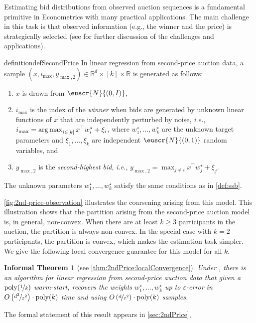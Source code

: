 \documentclass[11pt,letterpaper]{article}
\theoremstyle{plain}
\newtheorem{inftheorem}{Informal Theorem}
\theoremstyle{definition}
\theoremstyle{remark}
\newcommand{\inparen}[1]{\ensuremath{\left(#1\right)}}
\newcommand{\R}{\mathbb{R}}
\newcommand{\argmax}{\operatornamewithlimits{arg\,max}}
\newcommand{\nfrac}[2]{\nicefrac{#1}{#2}}
\newcommand{\poly}{\mathrm{poly}}
\newcommand{\eps}{\varepsilon}
\newcommand{\customcal}[1]{\euscr{#1}}
\newcommand{\cN}{\customcal{N}}
\newcommand{\ie}{\emph{i.e.}}
\newcommand{\normal}[2]{\cN{\inparen{#1,#2}}}
\newcommand{\smax}{\max,2} %
\newcommand{\imax}{i_{\max}}
\newcommand{\ysmax}{y_{\smax}}
\begin{document}
Estimating bid distributions from observed {auction sequences} is a fundamental {primitive} in Econometrics with many practical applications. 
{The main challenge in this task is that observed information 
(e.g., the winner and the price) 
is strategically selected} 
(see \cite{cherapanamjeri2022auctionEstimation} for further discussion 
{of the challenges and applications}). 
\begin{restatable}[]{definition}{defSecondPrice}
    \label{def:secondPrice}
    In linear regression from second-price auction data, a sample $(x,\imax,\ysmax) \in \R^d \times [k] \times \R$ is generated as follows: 
    \begin{enumerate}
        \item $x$ is drawn from $\normal{0}{I}$,
        \item $\imax$ is the index of the \emph{winner} when bids are generated by unknown linear functions of $x$ that are independently perturbed by noise, \ie{}, $\imax = \argmax_{i \in [k]} x^\top w_i^\star + \xi_i$, where $w_1^\star,\dots,w_k^\star$ are the unknown target parameters and $\xi_1,\dots,\xi_k$ are independent $\normal{0}{1}$ random variables, and 
        \item ${\ysmax}$ is the \emph{second-highest bid}, \ie{}, ${\ysmax} = \max_{j \neq i} x^\top w_j^\star + \xi_j$.
    \end{enumerate}
    The unknown parameters $w_1^\star,\dots,w_k^\star$ satisfy the same conditions as in \cref{def:ssb}.
\end{restatable} 
 \cref{fig:2nd-price-observation} illustrates the coarsening arising from this model.
{This illustration shows that the partition arising from the second-price auction model is, in general, non-convex. When there are at least $k\geq 3$ participants in the auction, the partition is always non-convex. In the special case with $k=2$ participants,
the partition is convex, which makes the estimation task simpler.}
We give the following local convergence guarantee for this model {for all $k$}.
\begin{inftheorem}[see \cref{thm:2ndPrice:localConvergence}]
Under , there is an algorithm for linear regression from second-price auction data that given {a} $\poly(\nfrac{1}{k})$ warm-start, recovers the weights $w_1^\star, \dots , w_k^\star$ up to $\eps$-error 
in $O\inparen{\nfrac{d^2}{\eps^2}}\cdot \poly(k)$ time and using $O\inparen{\nfrac{d}{\eps^2}}\cdot \poly(k)$ samples.
\end{inftheorem}
The formal statement of this result appears in \cref{sec:2ndPrice},
\end{document}
